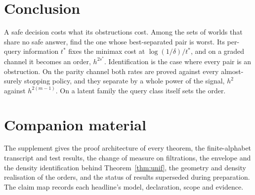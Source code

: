 \section{Conclusion}

A safe decision costs what its obstructions cost. Among the sets of worlds that share no safe
answer, find the one whose best-separated pair is worst. Its per-query information $t^{*}$
fixes the minimax cost at $\log(1/\delta)/t^{*}$, and on a graded channel it becomes an order,
$h^{2s^{*}}$. Identification is the case where every pair is an obstruction. On the parity
channel both rates are proved against every almost-surely stopping policy, and they separate
by a whole power of the signal, $h^{2}$ against $h^{2(m-1)}$. On a latent family the query
class itself sets the order.

\section*{Companion material}
The supplement gives the proof architecture of every theorem, the finite-alphabet transcript and
test results, the change of measure on filtrations, the envelope and the density identification
behind Theorem~\ref{thm:unif}, the geometry and density realisation of the orders, and the status
of results superseded during preparation. The claim map records each headline's model,
declaration, scope and evidence.

